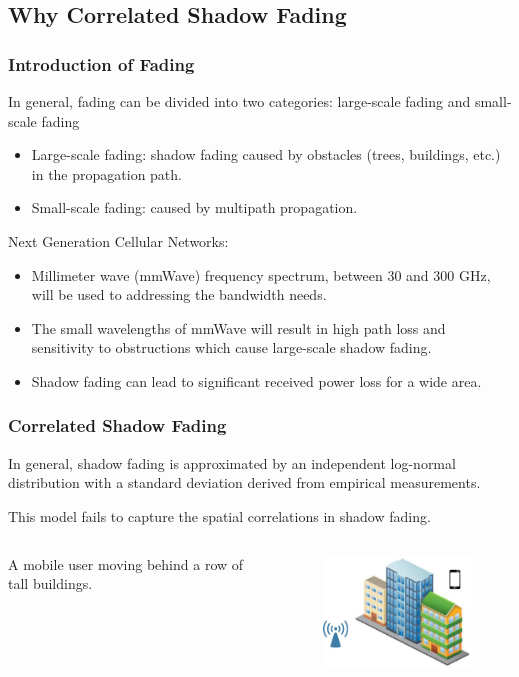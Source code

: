\documentclass{beamer}
\begin{document}
\subsection{Why Correlated Shadow Fading} %
\begin{frame}
\frametitle{Introduction of Fading}
In general, fading can be divided into two categories: large-scale fading and small-scale fading
\begin{itemize}
\item Large-scale fading: shadow fading caused by obstacles (trees, buildings, etc.) in the propagation path.
\item Small-scale fading: caused by multipath propagation.
\end{itemize}
Next Generation Cellular Networks:
\begin{itemize}
\item Millimeter wave (mmWave) frequency spectrum, between 30 and 300 GHz, will be used to addressing the bandwidth needs.
\item The small wavelengths of mmWave will result in high path loss and sensitivity to obstructions which cause large-scale shadow fading.
\item Shadow fading can lead to significant received power loss for a wide area.
\end{itemize}
\end{frame}

\begin{frame}
\frametitle{Correlated Shadow Fading}
\begin{block}{}
In general, shadow fading is approximated by an independent log-normal distribution with a standard deviation derived from empirical measurements.
\end{block}
\begin{block}{}
This model fails to capture the spatial correlations in shadow fading.
\end{block}
\begin{columns}[c]
A mobile user moving behind a row of tall buildings.
\begin{figure}
\includegraphics[width=5cm]{building.eps}
\end{figure}
\end{columns}
\end{frame}
%
%
\end{document}
